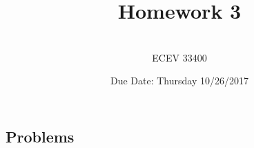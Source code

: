 \documentclass{article}
\begin{document}

\title{Homework 3} %
\author{ \\ECEV 33400} %
\date{Due Date: Thursday 10/26/2017} %

\maketitle

%
%

\subsection*{Problems} 
\end{document}
